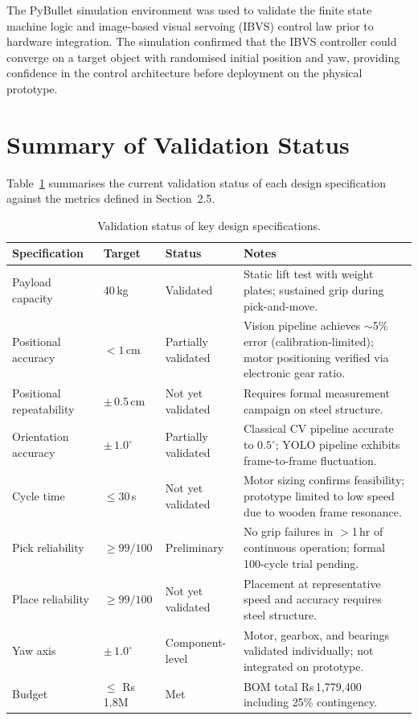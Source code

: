 The PyBullet simulation environment was used to validate the finite state machine logic and image-based visual servoing (IBVS) control law prior to hardware integration. The simulation confirmed that the IBVS controller could converge on a target object with randomised initial position and yaw, providing confidence in the control architecture before deployment on the physical prototype.


\section{Summary of Validation Status}

Table~\ref{tab:validation_summary} summarises the current validation status of each design specification against the metrics defined in Section~2.5.

\begin{table}[h]
\centering
\caption{Validation status of key design specifications.}
\label{tab:validation_summary}
\begin{tabularx}{\textwidth}{l l l X}
\toprule
\textbf{Specification} & \textbf{Target} & \textbf{Status} & \textbf{Notes} \\
\midrule
Payload capacity & 40\,kg & Validated & Static lift test with weight plates; sustained grip during pick-and-move. \\
Positional accuracy & $<1$\,cm & Partially validated & Vision pipeline achieves $\sim$5\% error (calibration-limited); motor positioning verified via electronic gear ratio. \\
Positional repeatability & $\pm\,0.5$\,cm & Not yet validated & Requires formal measurement campaign on steel structure. \\
Orientation accuracy & $\pm\,1.0^{\circ}$ & Partially validated & Classical CV pipeline accurate to $0.5^{\circ}$; YOLO pipeline exhibits frame-to-frame fluctuation. \\
Cycle time & $\leq 30$\,s & Not yet validated & Motor sizing confirms feasibility; prototype limited to low speed due to wooden frame resonance. \\
Pick reliability & $\geq 99/100$ & Preliminary & No grip failures in $>$1\,hr of continuous operation; formal 100-cycle trial pending. \\
Place reliability & $\geq 99/100$ & Not yet validated & Placement at representative speed and accuracy requires steel structure. \\
Yaw axis & $\pm\,1.0^{\circ}$ & Component-level & Motor, gearbox, and bearings validated individually; not integrated on prototype. \\
Budget & $\leq$ Rs\,1.8M & Met & BOM total Rs\,1,779,400 including 25\% contingency. \\
\bottomrule
\end{tabularx}
\end{table}

